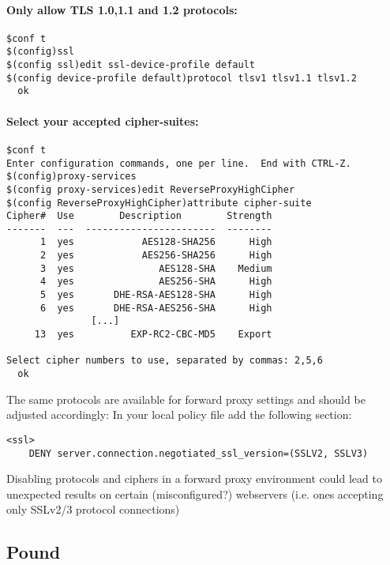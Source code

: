 \paragraph*{Only allow TLS 1.0,1.1 and 1.2 protocols:}
\begin{lstlisting}
$conf t
$(config)ssl
$(config ssl)edit ssl-device-profile default
$(config device-profile default)protocol tlsv1 tlsv1.1 tlsv1.2
  ok
\end{lstlisting}

\paragraph*{Select your accepted cipher-suites:}
\begin{lstlisting}
$conf t
Enter configuration commands, one per line.  End with CTRL-Z.
$(config)proxy-services
$(config proxy-services)edit ReverseProxyHighCipher
$(config ReverseProxyHighCipher)attribute cipher-suite
Cipher#  Use        Description        Strength
-------  ---  -----------------------  --------
      1  yes            AES128-SHA256      High
      2  yes            AES256-SHA256      High
      3  yes               AES128-SHA    Medium
      4  yes               AES256-SHA      High
      5  yes       DHE-RSA-AES128-SHA      High
      6  yes       DHE-RSA-AES256-SHA      High
               [...]
     13  yes          EXP-RC2-CBC-MD5    Export

Select cipher numbers to use, separated by commas: 2,5,6
  ok
\end{lstlisting}

The same protocols are available for forward proxy settings and should be adjusted accordingly:
In your local policy file add the following section:
\begin{lstlisting}
<ssl>
    DENY server.connection.negotiated_ssl_version=(SSLV2, SSLV3)
\end{lstlisting}

Disabling protocols and ciphers in a forward proxy environment could lead to unexpected results on certain (misconfigured?) webservers (i.e. ones accepting only SSLv2/3 protocol connections)


\subsection{Pound}

